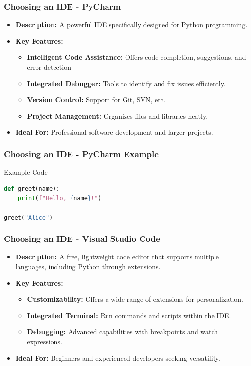 \documentclass{beamer}
\begin{document}
\begin{frame}[fragile]
    \frametitle{Choosing an IDE - PyCharm}
    \begin{itemize}
        \item \textbf{Description:} A powerful IDE specifically designed for Python programming.
        \item \textbf{Key Features:}
        \begin{itemize}
            \item \textbf{Intelligent Code Assistance:} Offers code completion, suggestions, and error detection.
            \item \textbf{Integrated Debugger:} Tools to identify and fix issues efficiently.
            \item \textbf{Version Control:} Support for Git, SVN, etc.
            \item \textbf{Project Management:} Organizes files and libraries neatly.
        \end{itemize}
        \item \textbf{Ideal For:} Professional software development and larger projects.
    \end{itemize}
\end{frame}

\begin{frame}[fragile]
    \frametitle{Choosing an IDE - PyCharm Example}
    \begin{block}{Example Code}
    \begin{lstlisting}[language=Python]
def greet(name):
    print(f"Hello, {name}!")

greet("Alice")
    \end{lstlisting}
    \end{block}
\end{frame}

\begin{frame}[fragile]
    \frametitle{Choosing an IDE - Visual Studio Code}
    \begin{itemize}
        \item \textbf{Description:} A free, lightweight code editor that supports multiple languages, including Python through extensions.
        \item \textbf{Key Features:}
        \begin{itemize}
            \item \textbf{Customizability:} Offers a wide range of extensions for personalization.
            \item \textbf{Integrated Terminal:} Run commands and scripts within the IDE.
            \item \textbf{Debugging:} Advanced capabilities with breakpoints and watch expressions.
        \end{itemize}
        \item \textbf{Ideal For:} Beginners and experienced developers seeking versatility.
    \end{itemize}
\end{frame}
\end{document}
